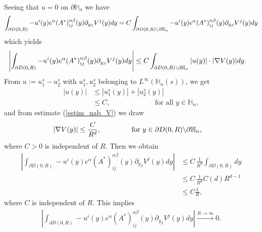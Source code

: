 \documentclass[11pt, reqno]{amsart}
\theoremstyle{definition}
\theoremstyle{remark}
\numberwithin{equation}{section}
\newcommand{\bs}{\symbol{92}}
\begin{document}
\begin{appendices}
		
		\\
		Seeing that $u=0$ on $\partial\mathbb{H}_n $ we have
		\begin{align*}
			\int_{\partial D(0,R) }  - u^i(y)e^\alpha (A^*)^{\alpha\beta}_{ij}(y) \partial_{y_\beta} V^j(y) dy = C \int_{\partial D(0,R)\bs \partial\mathbb{H}_n}  - u^i(y)e^\alpha (A^*)^{\alpha\beta}_{ij}(y) \partial_{y_\beta} V^j(y) dy
		\end{align*}
		which yields
		\begin{align*}
			\left| \int_{\partial D(0,R) }  - u^i(y)e^\alpha (A^*)^{\alpha\beta}_{ij}(y) \partial_{y_\beta} V^j(y)dy  \right| &\leq C \int_{ \partial D(0,R)\bs \partial \mathbb{H}_n }  |u(y)|\cdot | \nabla V(y) |dy.
		\end{align*}
		From  $u:=u_1^s-u_2^s$ with $u_1^s, u_2^s$ belonging to $L^\infty(\mathbb{H}_n(s))$, we get
		\begin{align}
			|u(y)|&\leq |u^s_1(y)| +  |u^s_2(y)| \nonumber\\
			&\leq C , \qquad \qquad \qquad \mbox{ for all } y\in  \mathbb{H}_n,\label{boundedness_of_v}
		\end{align}
		and from
		estimate (\ref{estim_nab_V}) we draw 
		\begin{align*}
			| \nabla V(y) |
			&  \leq   \frac{C}{R^d},\qquad \qquad \mbox{ for  } y\in \partial D(0,R)\bs \partial \mathbb{H}_n ,
		\end{align*}
		where $C>0$ is independent of $R$.  Then we obtain
		\begin{align*}
			\left| \int_{\partial D(0,R) }  -  u^i(y)e^\alpha (A^*)^{\alpha\beta}_{ij}(y) \partial_{y_\beta} V^j(y)  dy  \right|
			& \leq C \,\frac{1}{R^d} \int_{\partial D(0,R) }  dy\\
			& \leq C  \,\frac{1}{R^d} C(d) R^{d-1}\\
			& \leq C \frac{1}{R} ,
		\end{align*}
		where $C$ is independent of $R.$ This implies 
		\begin{align*}
			\left| \int_{\partial D(0,R) }   -   u^i(y)e^\alpha (A^*)^{\alpha\beta}_{ij}(y) \partial_{y_\beta} V^j(y)dy \right|\xrightarrow{R\rightarrow \infty}0.
		\end{align*}
		
		
		

\end{appendices}
\end{document}
